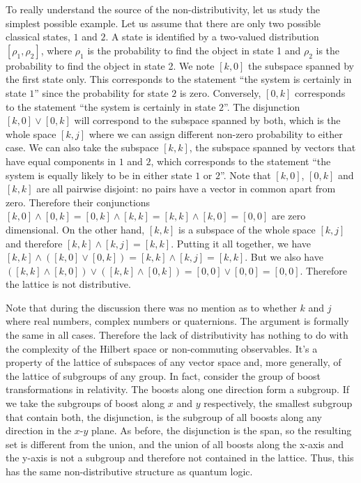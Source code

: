 \documentclass[11pt, executivepaper]{article}
\begin{document}
To really understand the source of the non-distributivity, let us study the simplest possible example. Let us assume that there are only two possible classical states, $1$ and $2$. A state is identified by a two-valued distribution $[\rho_1, \rho_2]$, where $\rho_1$ is the probability to find the object in state 1 and $\rho_2$ is the probability to find the object in state 2. We note $[k,0]$ the subspace spanned by the first state only. This corresponds to the statement ``the system is certainly in state $1$'' since the probability for state $2$ is zero. Conversely, $[0,k]$ corresponds to the statement ``the system is certainly in state $2$''. The disjunction $[k,0] \vee [0,k]$ will correspond to the subspace spanned by both, which is the whole space $[k,j]$ where we can assign different non-zero probability to either case. We can also take the subspace $[k,k]$, the subspace spanned by vectors that have equal components in $1$ and $2$, which corresponds to the statement ``the system is equally likely to be in either state $1$ or $2$''. Note that $[k,0]$, $[0,k]$ and $[k,k]$ are all pairwise disjoint: no pairs have a vector in common apart from zero. Therefore their conjunctions $[k,0] \wedge [0,k] = [0,k] \wedge [k,k] = [k,k] \wedge [k,0] = [0,0]$ are zero dimensional. On the other hand, $[k,k]$ is a subspace of the whole space $[k,j]$ and therefore $[k,k] \wedge [k,j] = [k,k]$. Putting it all together, we have $[k,k] \wedge ( [k,0] \vee [0,k] ) = [k,k] \wedge [k,j] = [k,k]$. But we also have $( [k,k] \wedge [k,0] ) \vee ( [k,k] \wedge [0,k] ) = [0,0] \vee [0,0] = [0,0]$. Therefore the lattice is not distributive.

Note that during the discussion there was no mention as to whether $k$ and $j$ where real numbers, complex numbers or quaternions. The argument is formally the same in all cases. Therefore the lack of distributivity has nothing to do with the complexity of the Hilbert space or non-commuting observables. It's a property of the lattice of subspaces of any vector space and, more generally, of the lattice of subgroups of any group. In fact, consider the group of boost transformations in relativity. The boosts along one direction form a subgroup. If we take the subgroups of boost along $x$ and $y$ respectively, the smallest subgroup that contain both, the disjunction, is the subgroup of all boosts along any direction in the $x$-$y$ plane. As before, the disjunction is the span, so the resulting set is different from the union, and the union of all boosts along the x-axis and the y-axis is not a subgroup and therefore not contained in the lattice. Thus, this has the same non-distributive structure as quantum logic.
\end{document}
